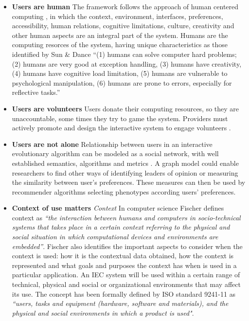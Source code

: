 \begin{itemize}
\item {\bf Users are human} 
  The framework follows the approach of human centered computing \cite{sebe2010human},
  in which the context, environment, interfaces, preferences, accessibility, human relations, cognitive
  limitations, culture, creativity and other human aspects are an integral part of the system.
  Humans are the computing resorces of the system, having unique characteristics as those identified by 
  Sun \& Dance \cite{Sun2013}  ``(1) humans can solve computer hard problems; (2) humans are very good at exception handling, (3) humans have creativity, (4) humans have cognitive load limitation, (5) humans are vulnerable to 
  psychological manipulation, (6) humans are prone to errors, especially for reflective tasks.''


\item {\bf Users are volunteers} Users donate their computing resources, so they are unaccountable, 
  some times they try to game the system. Providers must actively promote and design the interactive
  system to engage volunteers \cite{oh2015clicking}. %

\item {\bf Users are not alone}
  Relationship between users in an interactive evolutionary algorithm can be modeled
  as a social network, with well established semantics, algorithms and metrics \cite{ahuja1993network}.
  A graph model could enable researchers to find other ways of identifying leaders of 
  opinion or measuring the similarity between user's preferences. 
  These measures can then be used by recommender algorithms selecting 
  phenotypes according users' preferences. 

\item {\bf Context of use matters}
  \textit{Context} In computer science Fischer \cite{fischer2012context}
  defines context as \textit{``the interaction between humans and
  computers in socio-technical systems that takes place in a certain
  context referring to the physical and social situation in which
  computational devices and environments are embedded''}. 
  Fischer also identifies the important aspects to consider when the context is used: how it is
  the contextual data obtained, how the context is represented and what
  goals and purposes the context has when is used in a particular
  application.   An IEC system will  be used within a certain range of technical, physical and social or
  organizational environments \cite{maguire2001context} that may affect its use.
  The concept has been formally defined
  by ISO standard 9241-11 \cite{international1998iso} as \textit{``users,
  tasks and equipment (hardware, software and materials), and the
  physical and social environments in which a product is used"}.  


\end{itemize}
